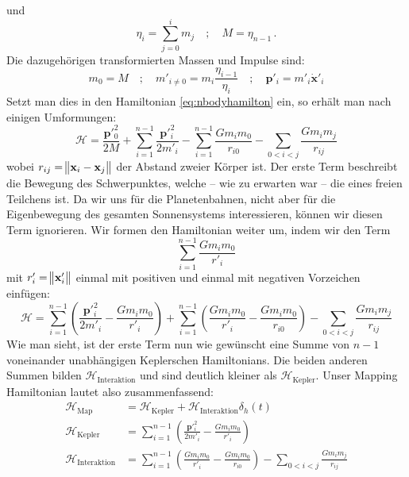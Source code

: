 \documentclass[12pt,a4paper,twoside,open=right,bibliography=totoc]{scrbook}
\renewcommand{\vec}{\mathbf}
\renewcommand{\H}{\mathcal H}
\begin{document}
und
\begin{equation}
\eta_i = \sum\limits_{j=0}^{i} m_j \quad ; \quad M = \eta_{n-1}\,.
\end{equation}
Die dazugehörigen transformierten Massen und Impulse sind:
\begin{equation}
m_0 = M \quad ; \quad m'_{i\neq 0} = m_i \frac{\eta_{i-1}}{\eta_{i}} \quad ; \quad \vec p'_i = m'_i \vec{\dot{x}}'_i
\end{equation}
Setzt man dies in den Hamiltonian \ref{eq:nbodyhamilton} ein, so erhält man nach einigen Umformungen: %
\begin{equation}
\H = \frac{\vec p'^2_0}{2M} + \sum\limits_{i=1}^{n-1} \frac{\vec p'^2_i}{2m'_i} - \sum\limits_{i=1}^{n-1} \frac{Gm_im_0}{r_{i0}} - \sum\limits_{0<i<j} \frac{Gm_im_j}{r_{ij}}
\end{equation}
wobei $r_{ij}=\norm{\vec{x}_i-\vec{x}_j}$ der Abstand zweier Körper ist. Der erste Term beschreibt die Bewegung des Schwerpunktes, welche – wie zu erwarten war – die eines freien Teilchens ist. Da wir uns für die Planetenbahnen, nicht aber für die Eigenbewegung des gesamten Sonnensystems interessieren, können wir diesen Term ignorieren.
Wir formen den Hamiltonian weiter um, indem wir den Term
\begin{equation}
\sum\limits_{i=1}^{n-1} \frac{Gm_im_0}{r'_i}
\end{equation}
mit $r'_i = \norm{\vec x'_i}$ einmal mit positiven und einmal mit negativen Vorzeichen einfügen:
\begin{equation}
\H = \sum\limits_{i=1}^{n-1} \left( \frac{\vec p'^2_i}{2m'_i} - \frac{Gm_im_0}{r'_i} \right)
  +  \sum\limits_{i=1}^{n-1} \left( \frac{Gm_im_0}{r'_i} - \frac{Gm_im_0}{r_{i0}} \right)
  -  \sum\limits_{0<i<j} \frac{Gm_im_j}{r_{ij}}
\end{equation}
Wie man sieht, ist der erste Term nun wie gewünscht eine Summe von $n-1$ voneinander unabhängigen Keplerschen Hamiltonians. Die beiden anderen Summen bilden $\H_{\mathrm{Interaktion}}$ und sind deutlich kleiner als $\H_{\mathrm{Kepler}}$. Unser Mapping Hamiltonian lautet also zusammenfassend:
\begin{align}
\H_{\mathrm{Map}} &= \H_{\mathrm{Kepler}} + \H_{\mathrm{Interaktion}}\delta_{h}(t) \\
\H_{\mathrm{Kepler}} &= \sum\limits_{i=1}^{n-1} \left( \frac{\vec p'^2_i}{2m'_i} - \frac{Gm_im_0}{r'_i} \right) \\
\H_{\mathrm{Interaktion}} &= \sum\limits_{i=1}^{n-1} \left( \frac{Gm_im_0}{r'_i} - \frac{Gm_im_0}{r_{i0}} \right)
  -  \sum\limits_{0<i<j} \frac{Gm_im_j}{r_{ij}}
\end{align}
\end{document}
